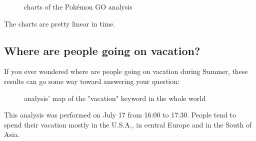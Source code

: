 \documentclass[a4paper,11pt]{report}
\begin{document}
\begin{figure}[H]
\vspace{-5pt}
\begin{center}
\vspace{-20pt}
\caption{charts of the Pokémon GO analysis}
\end{center}
\end{figure}
\vspace{-10pt}

The charts are pretty linear in time.
\newpage

\subsection{Where are people going on vacation?}
If you ever wondered where are people going on vacation during Summer, these results can go some way toward answering your question:
\begin{figure}[H]
\vspace{-5pt}
\begin{center}
\vspace{-20pt}
\caption{analysis' map of the "vacation" keyword in the whole world}
\end{center}
\end{figure}
\vspace{-10pt}
This analysis was performed on July 17 from 16:00 to 17:30. People tend to spend their vacation mostly in the U.S.A., in central Europe and in the South of Asia.
\bigskip
\end{document}
